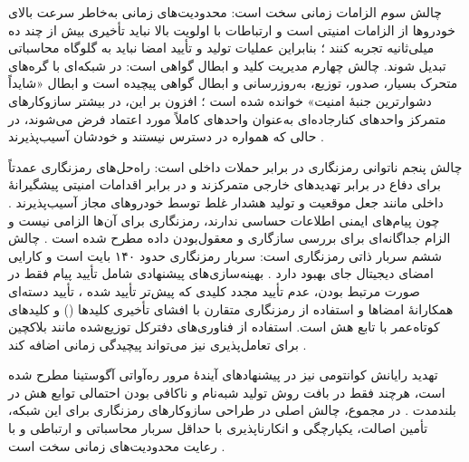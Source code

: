 چالش سوم الزامات زمانی سخت است: محدودیت‌های زمانی به‌خاطر سرعت بالای خودروها از الزامات امنیتی است \cite{SecuringVehicularAd} و ارتباطات با اولویت بالا نباید تأخیری بیش از چند ده میلی‌ثانیه تجربه کنند \cite{farsimadanReviewSecurityChallenges2025}؛ بنابراین عملیات تولید و تأیید امضا نباید به گلوگاه محاسباتی تبدیل شوند. چالش چهارم مدیریت کلید و ابطال گواهی است: در شبکه‌ای با گره‌های متحرک بسیار، صدور، توزیع، به‌روزرسانی و ابطال گواهی پیچیده است و ابطال «شایداً دشوارترین جنبهٔ امنیت» خوانده شده است \cite{SecuringVehicularAd}؛ افزون بر این، در بیشتر سازوکارهای متمرکز واحدهای کنارجاده‌ای به‌عنوان واحدهای کاملاً مورد اعتماد فرض می‌شوند، در حالی که همواره در دسترس نیستند و خودشان آسیب‌پذیرند \cite{farsimadanReviewSecurityChallenges2025}.

چالش پنجم ناتوانی رمزنگاری در برابر حملات داخلی است: راه‌حل‌های رمزنگاری عمدتاً برای دفاع در برابر تهدیدهای خارجی متمرکزند و در برابر اقدامات امنیتی پیشگیرانهٔ داخلی مانند جعل موقعیت و تولید هشدار غلط توسط خودروهای مجاز آسیب‌پذیرند \cite{farsimadanReviewSecurityChallenges2025}. چون پیام‌های ایمنی اطلاعات حساسی ندارند، رمزنگاری برای آن‌ها الزامی نیست و الزام جداگانه‌ای برای بررسی سازگاری و معقول‌بودن داده مطرح شده است \cite{SecuringVehicularAd}. چالش ششم سربار ذاتی رمزنگاری است: سربار رمزنگاری حدود ۱۴۰ بایت است و کارایی امضای دیجیتال جای بهبود دارد \cite{SecuringVehicularAd}. بهینه‌سازی‌های پیشنهادی شامل تأیید پیام فقط در صورت مرتبط بودن، عدم تأیید مجدد کلیدی که پیش‌تر تأیید شده \cite{SecuringVehicularAd}، تأیید دسته‌ای همکارانهٔ امضاها \cite{farsimadanReviewSecurityChallenges2025} و استفاده از رمزنگاری متقارن با افشای تأخیری کلیدها () و کلیدهای کوتاه‌عمر با تابع هش \cite{farsimadanReviewSecurityChallenges2025} است. استفاده از فناوری‌های دفترکل توزیع‌شده مانند بلاکچین برای تعامل‌پذیری نیز می‌تواند پیچیدگی زمانی اضافه کند \cite{farsimadanReviewSecurityChallenges2025}.

تهدید رایانش کوانتومی نیز در پیشنهادهای آیندهٔ مرور ره‌آواتی آگوستینا مطرح شده است، هرچند فقط در بافت روش تولید شبه‌نام و ناکافی بودن احتمالی توابع هش در بلندمدت \cite{rahmawatiagustinaSystematicLiteratureReview2025}. در مجموع، چالش اصلی در طراحی سازوکارهای رمزنگاری برای این شبکه، تأمین اصالت، یکپارچگی و انکارناپذیری با حداقل سربار محاسباتی و ارتباطی و با رعایت محدودیت‌های زمانی سخت است \cite{SecuringVehicularAd, farsimadanReviewSecurityChallenges2025, zhangRAISEEfficientRSUAided2008}.

